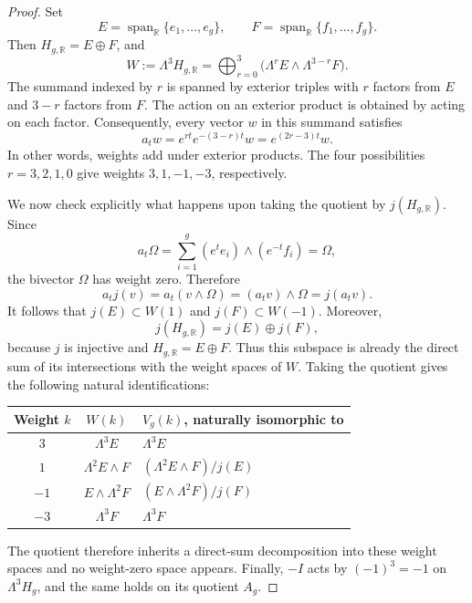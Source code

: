 \documentclass[10pt,a4paper]{amsart}
\newcommand{\R}{\mathbb R}
\begin{document}
\begin{proof}
Set
\[
 E=\operatorname{span}_\R\{e_1,\ldots,e_g\},\qquad
 F=\operatorname{span}_\R\{f_1,\ldots,f_g\}.
\]
Then \(H_{g,\R}=E\oplus F\), and
\[
 W:=\Lambda^3 H_{g,\R}
 =\bigoplus_{r=0}^3
   \bigl(\Lambda^r E\wedge\Lambda^{3-r}F\bigr).
\]
The summand indexed by \(r\) is spanned by exterior triples
with \(r\) factors from \(E\) and \(3-r\) factors from \(F\).
The action on an exterior product is obtained by acting on
each factor. Consequently, every vector \(w\) in this summand
satisfies
\[
 a_t w=e^{rt}e^{-(3-r)t}w=e^{(2r-3)t}w.
\]
In other words, weights add under exterior products. The four
possibilities \(r=3,2,1,0\) give weights \(3,1,-1,-3\),
respectively.

We now check explicitly what happens upon taking the quotient
by \(j(H_{g,\R})\). Since
\[
 a_t\Omega
 =\sum_{i=1}^g(e^te_i)\wedge(e^{-t}f_i)
 =\Omega,
\]
the bivector \(\Omega\) has weight zero. Therefore
\[
 a_t j(v)=a_t(v\wedge\Omega)
         =(a_t v)\wedge\Omega=j(a_t v).
\]
It follows that \(j(E)\subset W(1)\) and
\(j(F)\subset W(-1)\). Moreover,
\[
 j(H_{g,\R})=j(E)\oplus j(F),
\]
because \(j\) is injective and \(H_{g,\R}=E\oplus F\).
Thus this subspace is already the direct sum of its intersections
with the weight spaces of \(W\). Taking the quotient gives the
following natural identifications:
\begin{center}
\begin{tabular}{ccl}
\toprule
Weight \(k\) & \(W(k)\) & \(V_g(k)\), naturally isomorphic to\\
\midrule
\(3\) & \(\Lambda^3E\) & \(\Lambda^3E\)\\
\(1\) & \(\Lambda^2E\wedge F\) &
  \((\Lambda^2E\wedge F)/j(E)\)\\
\(-1\) & \(E\wedge\Lambda^2F\) &
  \((E\wedge\Lambda^2F)/j(F)\)\\
\(-3\) & \(\Lambda^3F\) & \(\Lambda^3F\)\\
\bottomrule
\end{tabular}
\end{center}
The quotient therefore inherits a direct-sum decomposition into
these weight spaces and no weight-zero space appears.
Finally, \(-I\) acts by \((-1)^3=-1\) on \(\Lambda^3H_g\),
and the same holds on its quotient \(A_g\).
\end{proof}
\end{document}
